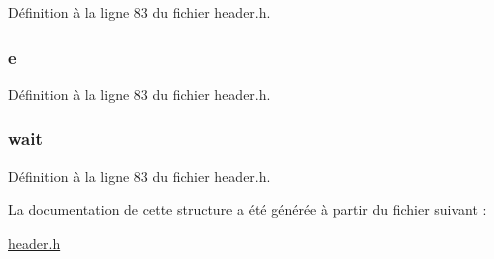 Définition à la ligne 83 du fichier header.\-h.

\hypertarget{structt__skill__list_aa756d3dbc91762775cff0f4b52526a70}{
\subsubsection[{e}]{ e}}\label{structt__skill__list_aa756d3dbc91762775cff0f4b52526a70}


Définition à la ligne 83 du fichier header.\-h.

\hypertarget{structt__skill__list_a2a4af1a4acb8da6061990f9bd8d0a564}{
\subsubsection[{wait}]{ wait}}\label{structt__skill__list_a2a4af1a4acb8da6061990f9bd8d0a564}


Définition à la ligne 83 du fichier header.\-h.



La documentation de cette structure a été générée à partir du fichier suivant \-:\begin{DoxyCompactItemize}
\item 
\hyperlink{header_8h}{header.\-h}\end{DoxyCompactItemize}
